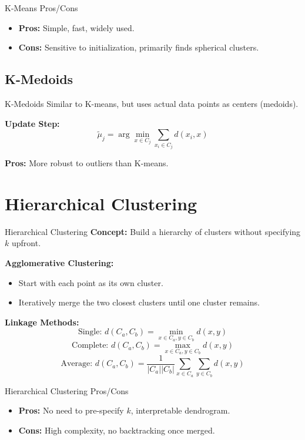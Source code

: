 \documentclass{beamer}
\begin{document}
\begin{frame}{K-Means Pros/Cons}
    \begin{itemize}
        \item \textbf{Pros:} Simple, fast, widely used.
        \item \textbf{Cons:} Sensitive to initialization, primarily finds spherical clusters.
    \end{itemize}
\end{frame}

\subsection{K-Medoids}
\begin{frame}{K-Medoids}
    Similar to K-means, but uses actual data points as centers (medoids).
    
    \textbf{Update Step:}
    \[
        \tilde{\mu}_j = \arg\min_{x \in C_j} \sum_{x_i \in C_j} d(x_i, x)
    \]
    
    \textbf{Pros:} More robust to outliers than K-means.
\end{frame}

\section{Hierarchical Clustering}
\begin{frame}{Hierarchical Clustering}
    \textbf{Concept:} Build a hierarchy of clusters without specifying $k$ upfront.
    
    \textbf{Agglomerative Clustering:}
    \begin{itemize}
        \item Start with each point as its own cluster.
        \item Iteratively merge the two closest clusters until one cluster remains.
    \end{itemize}
    
    \textbf{Linkage Methods:}
    \[
        \text{Single: } d(C_a, C_b) = \min_{x \in C_a, y \in C_b} d(x,y)
    \]
    \[
        \text{Complete: } d(C_a, C_b) = \max_{x \in C_a, y \in C_b} d(x,y)
    \]
    \[
        \text{Average: } d(C_a, C_b) = \frac{1}{|C_a||C_b|}\sum_{x \in C_a}\sum_{y \in C_b} d(x,y)
    \]
\end{frame}

\begin{frame}{Hierarchical Clustering Pros/Cons}
    \begin{itemize}
        \item \textbf{Pros:} No need to pre-specify $k$, interpretable dendrogram.
        \item \textbf{Cons:} High complexity, no backtracking once merged.
    \end{itemize}
\end{frame}
\end{document}
